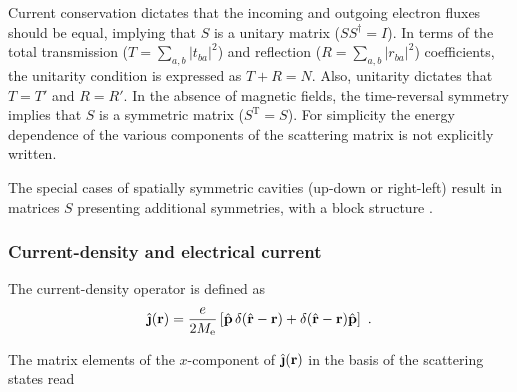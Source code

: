 \documentclass[a4paper,10pt]{article}
\newcommand{\br}{\mathbf{r}}
\newcommand{\nin}{\noindent}
\def\Me{M_{\rm e}}
\def\hbj{\hat{\mbox{\bf \j}}}
\begin{document}
\nin Current conservation dictates that the incoming and outgoing electron fluxes should be equal, implying that $S$ is a unitary matrix ($S S^{\dagger} = I$). In terms of the total transmission ($T=\sum_{a,b}|t_{ba}|^2$) and reflection ($R=\sum_{a,b}|r_{ba}|^2$) coefficients, the unitarity condition is expressed as $T+R=N$.  
Also, unitarity dictates that $T\!=\!T'$ and $R\!=\!R'$. 
In the absence of magnetic fields, the time-reversal symmetry implies that $S$ is a symmetric matrix ($S^{\mathrm{T}}=S$).
For simplicity the energy dependence of the various components of the 
scattering matrix is not explicitly written. 

\nin The special cases of spatially symmetric cavities (up-down or right-left) result in matrices $S$ presenting additional symmetries, with a block structure \cite{BaMe96}.

\subsubsection{Current-density and electrical current}

The current-density operator is defined as  
\begin{equation}
\hbj(\br)=\frac{e}{2\Me}\left[\hat{\mathbf{p}}\,
\delta(\hat{\br}-\br)+\delta(\hat{\br}-\br)\hat{\mathbf{p}}\right] \ .
\end{equation}

\nin The matrix elements of the $x$-component of $\hbj(\br)$ in the basis of the scattering states read 
\end{document}

